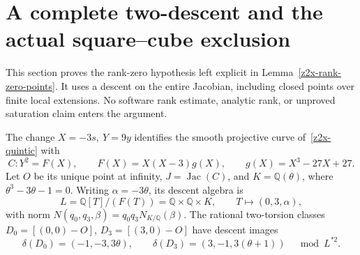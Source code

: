 \section{A complete two-descent and the actual square--cube exclusion}
\label{zd2x-section}

This section proves the rank-zero hypothesis left explicit in
Lemma~\ref{z2x-rank-zero-points}. It uses a descent on the entire
Jacobian, including closed points over finite local extensions.
No software rank estimate, analytic rank, or unproved saturation
claim enters the argument.

\begin{lemma}
\label{zd2x-model-descent}
The change \(X=-3s,\ Y=9y\) identifies the smooth projective curve
of~\eqref{z2x-quintic} with
\begin{equation}
 C:Y^2=F(X),\qquad
 F(X)=X(X-3)g(X),\qquad g(X)=X^3-27X+27.
 \label{zd2x-monic}
\end{equation}
Let \(O\) be its unique point at infinity, \(J=\operatorname{Jac}(C)\),
and \(K=\mathbb Q(\theta)\), where \(\theta^3-3\theta-1=0\).
Writing \(\alpha=-3\theta\), its descent algebra is
\begin{equation}
 L=\mathbb Q[T]/(F(T))=\mathbb Q\times\mathbb Q\times K,\qquad
 T\longmapsto(0,3,\alpha),
 \label{zd2x-algebra}
\end{equation}
with norm \(N(q_0,q_3,\beta)=q_0q_3N_{K/\mathbb Q}(\beta)\).
The rational two-torsion classes
\(D_0=[(0,0)-O]\), \(D_3=[(3,0)-O]\) have descent images
\begin{equation}
 \delta(D_0)=(-1,-3,3\theta),\qquad
 \delta(D_3)=(3,-1,3(\theta+1))
 \quad\bmod L^{*2}.
 \label{zd2x-torsion-images}
\end{equation}
\end{lemma}
